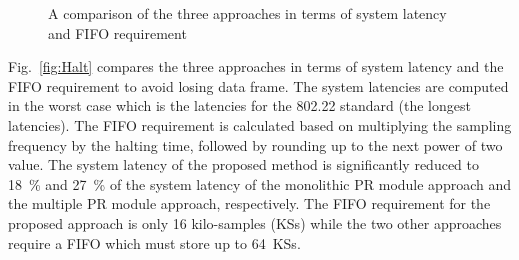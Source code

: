 \begin{figure}	
\centering
{}
\caption{A comparison of the three approaches in terms of system latency and FIFO requirement}
\label{fig:LatFIFO}
\end{figure}

Fig.~\ref{fig:Halt} compares the three approaches in terms of system latency and the FIFO requirement to avoid losing data frame. The system latencies are computed in the worst case which is the latencies for the 802.22 standard (the longest latencies). The FIFO requirement is calculated based on multiplying the sampling frequency by the halting time, followed by rounding up to the next power of two value. The system latency of the proposed method is significantly reduced to 18~\% and 27~\% of the system latency of the monolithic PR module approach and the multiple PR module approach, respectively. The FIFO requirement for the proposed approach is only 16 kilo-samples (KSs) while the two other approaches require a FIFO which must store up to 64~KSs.

